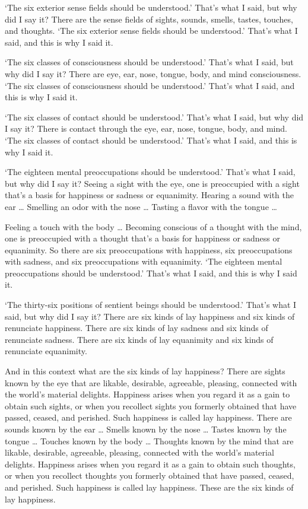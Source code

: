 \documentclass[12pt,openany]{book}%
\begin{document}
‘The six exterior sense fields should be understood.’ That’s what I said, but why did I say it? There are the sense fields of sights, sounds, smells, tastes, touches, and thoughts. ‘The six exterior sense fields should be understood.’ That’s what I said, and this is why I said it. 

‘The six classes of consciousness should be understood.’ That’s what I said, but why did I say it? There are eye, ear, nose, tongue, body, and mind consciousness. ‘The six classes of consciousness should be understood.’ That’s what I said, and this is why I said it. 

‘The six classes of contact should be understood.’ That’s what I said, but why did I say it? There is contact through the eye, ear, nose, tongue, body, and mind. ‘The six classes of contact should be understood.’ That’s what I said, and this is why I said it. 

‘The eighteen mental preoccupations should be understood.’ That’s what I said, but why did I say it? Seeing a sight with the eye, one is preoccupied with a sight that’s a basis for happiness or sadness or equanimity. Hearing a sound with the ear … Smelling an odor with the nose … Tasting a flavor with the tongue … 

Feeling a touch with the body … Becoming conscious of a thought with the mind, one is preoccupied with a thought that’s a basis for happiness or sadness or equanimity. So there are six preoccupations with happiness, six preoccupations with sadness, and six preoccupations with equanimity. ‘The eighteen mental preoccupations should be understood.’ That’s what I said, and this is why I said it. 

‘The thirty-six positions of sentient beings should be understood.’ That’s what I said, but why did I say it? There are six kinds of lay happiness and six kinds of renunciate happiness. There are six kinds of lay sadness and six kinds of renunciate sadness. There are six kinds of lay equanimity and six kinds of renunciate equanimity. 

And in this context what are the six kinds of lay happiness? There are sights known by the eye that are likable, desirable, agreeable, pleasing, connected with the world’s material delights. Happiness arises when you regard it as a gain to obtain such sights, or when you recollect sights you formerly obtained that have passed, ceased, and perished. Such happiness is called lay happiness. There are sounds known by the ear … Smells known by the nose … Tastes known by the tongue … Touches known by the body … Thoughts known by the mind that are likable, desirable, agreeable, pleasing, connected with the world’s material delights. Happiness arises when you regard it as a gain to obtain such thoughts, or when you recollect thoughts you formerly obtained that have passed, ceased, and perished. Such happiness is called lay happiness. These are the six kinds of lay happiness. 
\end{document}
